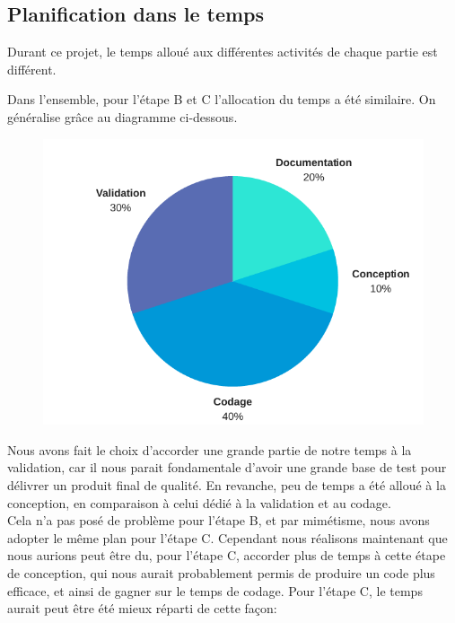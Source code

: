 \documentclass{article}
\begin{document}
\subsection{Planification dans le temps}
Durant ce projet, le temps alloué aux différentes activités de chaque partie est différent. \newline

Dans l'ensemble, pour l'étape B et C l'allocation du temps a été similaire. On généralise grâce au diagramme ci-dessous.
\begin{figure}[ht]
\centering
      \includegraphics[scale=0.30]{temps_passe.png}
\end{figure}
\newline
Nous avons fait le choix d'accorder une grande partie de notre temps à la validation, car il nous parait fondamentale d'avoir une grande base
de test pour délivrer un produit final de qualité. En revanche, peu de temps a été alloué à la conception, en comparaison à celui dédié à la validation et au codage. \newline \\
Cela n'a pas posé de problème pour l'étape B, et par mimétisme, nous avons
adopter le même plan pour l'étape C. Cependant nous réalisons maintenant que nous aurions peut être du, pour l'étape C,
accorder plus de temps à cette étape de conception, qui nous aurait probablement permis de produire un code plus efficace, et ainsi
de gagner sur le temps de codage. Pour l'étape C, le temps aurait peut être été mieux réparti de cette façon:
\end{document}

